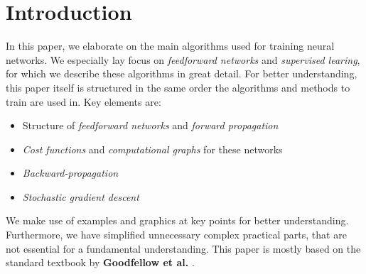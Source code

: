 \section{Introduction}
\label{sec:introduction}

In this paper, we elaborate on the main algorithms used for training neural networks.
We especially lay focus on \emph{feedforward networks} and \emph{supervised learing}, for which we describe these algorithms in great detail.
For better understanding, this paper itself is structured in the same order the algorithms and methods to train are used in.
Key elements are:
\begin{itemize}
    \item Structure of \emph{feedforward networks} and \emph{forward propagation}
    \item \emph{Cost functions} and \emph{computational graphs} for these networks
    \item \emph{Backward-propagation}
    \item \emph{Stochastic gradient descent}
\end{itemize}
We make use of examples and graphics at key points for better understanding.
Furthermore, we have simplified unnecessary complex practical parts, that are not essential for a fundamental understanding.
This paper is mostly based on the standard textbook by \textbf{Goodfellow et al.} \cite{Goodfellow-et-al-2016}.